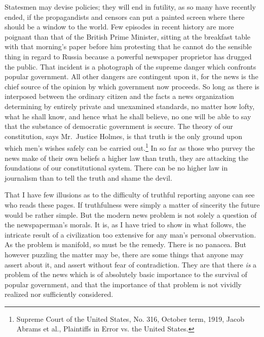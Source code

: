 \documentclass[openany,nobib,twoside,nohyper]{tufte-book}
\begin{document}
Statesmen may devise policies; they will end in futility, as so many
have recently ended, if the propagandists and censors can put a painted
screen where there should be a window to the world. Few episodes in
recent history are more poignant than that of the British Prime
Minister, sitting at the breakfast table with that morning's paper
before him protesting that he cannot do the sensible thing in regard to
Russia because a powerful newspaper proprietor has drugged the public.
That incident is a photograph of the supreme danger which confronts
popular government. All other dangers are contingent upon it, for the
news is the chief source of the opinion by which government now
proceeds. So long as there is interposed between the ordinary citizen
and the facts a news organization determining by entirely private and
unexamined standards, no matter how lofty, what he shall know, and hence
what he shall believe, no one will be able to say that the substance of
democratic government is secure. The theory of our constitution, says
Mr.~Justice Holmes, is that truth is the only ground upon which men's
wishes safely can be carried out.\footnote{Supreme Court of the United States, No. 316, October term, 1919, Jacob
  Abrams et al., Plaintiffs in Error vs. the United States.}
In so far as those who purvey the news make of their own beliefs a
higher law than truth, they are attacking the foundations of our
constitutional system. There can be no higher law in journalism than to
tell the truth and shame the devil.

That I have few illusions as to the difficulty of truthful reporting
anyone can see who reads these pages. If truthfulness were simply a
matter of sincerity the future would be rather simple. But the modern
news problem is not solely a question of the newspaperman's morals. It
is, as I have tried to show in what follows, the intricate result of a
civilization too extensive for any man's personal observation. As the
problem is manifold, so must be the remedy. There is no panacea. But
however puzzling the matter may be, there are some things that anyone
may assert about it, and assert without fear of contradiction. They are
that there \emph{is} a problem of the news which is of absolutely basic
importance to the survival of popular government, and that the
importance of that problem is not vividly realized nor sufficiently
considered.
\end{document}
